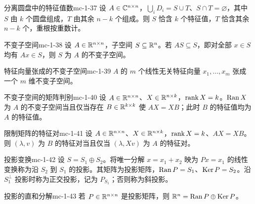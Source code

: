 \begin{theorem}{分离圆盘中的特征值数}{mc-1-37}
设 $A\in\mathbb{C}^{n\times n}$，$\bigcup_iD_i=S\cup T$、$S\cap T=\varnothing$，其中 $S$ 由 $k$ 个圆盘组成，$T$ 由其余 $n-k$ 个组成。则 $S$ 恰含 $k$ 个特征值，$T$ 恰含其余 $n-k$ 个，重根按重数计。
\end{theorem}

\begin{definition}{不变子空间}{mc-1-38}
设 $A\in\mathbb{R}^{n\times n}$，子空间 $S\subseteq\mathbb{R}^n$。若 $AS\subseteq S$，即对全部 $x\in S$ 均有 $Ax\in S$，则 $S$ 为 $A$ 的不变子空间。
\end{definition}

\begin{theorem}{特征向量张成的不变子空间}{mc-1-39}
$A$ 的 $m$ 个线性无关特征向量 $x_1,\ldots,x_m$ 张成一个 $m$ 维不变子空间。
\end{theorem}

\begin{theorem}{不变子空间的矩阵判别}{mc-1-40}
设 $A\in\mathbb{R}^{n\times n}$、$X\in\mathbb{R}^{n\times k}$，$\operatorname{rank} X=k$。$\operatorname{Ran} X$ 为 $A$ 的不变子空间当且仅当存在 $B\in\mathbb{R}^{k\times k}$ 使 $AX=XB$；此时 $B$ 的特征值均为 $A$ 的特征值。
\end{theorem}

\begin{corollary}{限制矩阵的特征对}{mc-1-41}
设 $A\in\mathbb{R}^{n\times n}$、$X\in\mathbb{R}^{n\times k}$，$\operatorname{rank} X=k$、$AX=XB$。则 $(\lambda,v)$ 为 $B$ 的特征对当且仅当 $(\lambda,Xv)$ 为 $A$ 的特征对。
\end{corollary}

\begin{definition}{投影变换}{mc-1-42}
设 $S=S_1\oplus S_2$。将唯一分解 $x=x_1+x_2$ 映为 $Px=x_1$ 的线性变换称为沿 $S_2$ 到 $S_1$ 的投影。其矩阵为投影矩阵，$\operatorname{Ran} P=S_1$、$\operatorname{Ker} P=S_2$。沿 $S_1^\perp$ 投影时称为正交投影，记为 $P_{S_1}$；否则称为斜投影。
\end{definition}

\begin{lemma}{投影的直和分解}{mc-1-43}
若 $P\in\mathbb{R}^{n\times n}$ 是投影矩阵，则 $\mathbb{R}^n=\operatorname{Ran} P\oplus\operatorname{Ker} P$。
\end{lemma}

